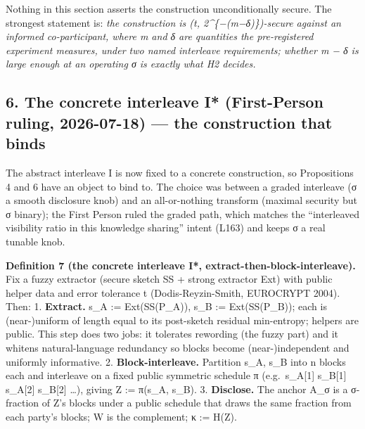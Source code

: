 \documentclass[
  11pt,
]{article}
\begin{document}
Nothing in this section asserts the construction unconditionally secure.
The strongest statement is: \emph{the construction is (t,
2\^{}\{−(m−δ)\})-secure against an informed co-participant, where m and
δ are quantities the pre-registered experiment measures, under two named
interleave requirements; whether m − δ is large enough at an operating σ
is exactly what H2 decides.}

\subsection{6. The concrete interleave I* (First-Person ruling,
2026-07-18) --- the construction that
binds}\label{the-concrete-interleave-i-first-person-ruling-2026-07-18-the-construction-that-binds}

The abstract interleave I is now fixed to a concrete construction, so
Propositions 4 and 6 have an object to bind to. The choice was between a
graded interleave (σ a smooth disclosure knob) and an all-or-nothing
transform (maximal security but σ binary); the First Person ruled the
graded path, which matches the ``interleaved visibility ratio in this
knowledge sharing'' intent (L163) and keeps σ a real tunable knob.

\textbf{Definition 7 (the concrete interleave I*,
extract-then-block-interleave).} Fix a fuzzy extractor (secure sketch SS
+ strong extractor Ext) with public helper data and error tolerance t
(Dodis-Reyzin-Smith, EUROCRYPT 2004). Then: 1. \textbf{Extract.} s\_A :=
Ext(SS(P\_A)), s\_B := Ext(SS(P\_B)); each is (near-)uniform of length
equal to its post-sketch residual min-entropy; helpers are public. This
step does two jobs: it tolerates rewording (the fuzzy part) and it
whitens natural-language redundancy so blocks become (near-)independent
and uniformly informative. 2. \textbf{Block-interleave.} Partition s\_A,
s\_B into n blocks each and interleave on a fixed public symmetric
schedule π (e.g.~s\_A{[}1{]} s\_B{[}1{]} s\_A{[}2{]} s\_B{[}2{]}
\ldots), giving Z := π(s\_A, s\_B). 3. \textbf{Disclose.} The anchor
A\_σ is a σ-fraction of Z's blocks under a public schedule that draws
the same fraction from each party's blocks; W is the complement; κ :=
H(Z).
\end{document}
